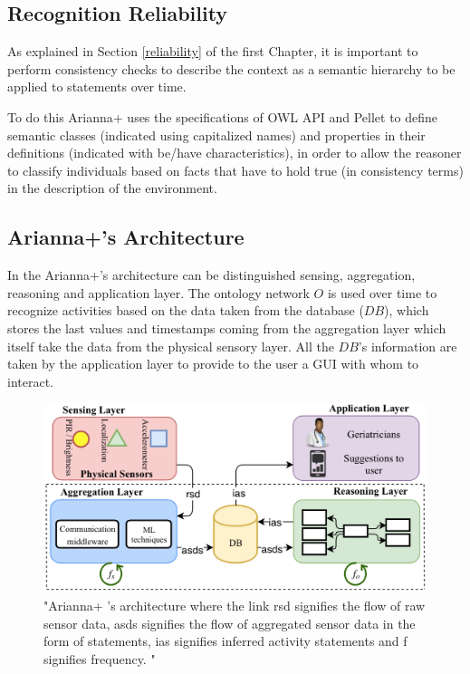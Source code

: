 \documentclass{thesisreport}
\begin{document}
 \subsection{Recognition Reliability}
 As explained in Section \ref{reliability} of the first Chapter, it is important to perform consistency checks to describe the context as a semantic hierarchy to be applied to statements over time.
 
 To do this Arianna+ uses the specifications of OWL API and Pellet to define semantic classes (indicated using capitalized names) and properties in their definitions (indicated with be/have characteristics), in order to allow the reasoner to classify individuals based on facts that have to hold true (in consistency terms) in the description of the environment.
 
 \subsection{Arianna+’s Architecture}
 In the Arianna+'s architecture can be distinguished sensing, aggregation, reasoning and application layer.  
 The ontology network $O$ is used over time to recognize activities based on the data taken from the database ($DB$), which stores the last values and timestamps coming from the aggregation layer which itself take the data from the physical sensory layer.
 All the $DB$'s information are taken by the application layer to provide to the user a GUI with whom to interact.  
 
 \begin{figure}[H]
	\centering
	\includegraphics[width=17cm]{Thesis/data/layers.pdf}
	\caption{"Arianna+ ’s architecture where the link rsd signifies the flow of raw sensor data, asds signifies the flow of aggregated sensor data in the form of statements, ias signifies inferred activity statements and f signifies frequency. \cite{kareem2018arianna}"}
	\label{fig:layers}
 \end{figure}
 
\end{document}

